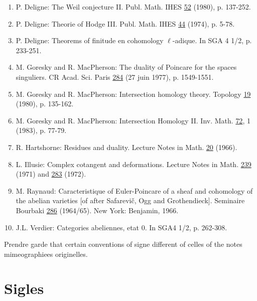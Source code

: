 \documentclass[12pt,a4paper]{article}
\theoremstyle{plain}
\theoremstyle{definition}
\theoremstyle{remark}
\begin{document}
\begin{enumerate}
\item[{[1]}] P. Deligne: The Weil conjecture II. Publ. Math. IHES \underline{52} (1980), p. 137-252.

\item[{[2]}] P. Deligne: Theorie of Hodge III. Publ. Math. IHES \underline{44} (1974), p. 5-78.

\item[{[3]}] P. Deligne: Theorems of finitude en cohomology $\ell$-adique. In SGA 4 1/2, p. 233-251.

\item[{[4]}] M. Goresky and R. MacPherson: The duality of Poincare for the spaces singuliers. CR Acad. Sci. Paris \underline{284} (27 juin 1977), p. 1549-1551.

\item[{[5]}] M. Goresky and R. MacPherson: Intersection homology theory. Topology \underline{19} (1980), p. 135-162.

\item[{[6]}] M. Goresky and R. MacPherson: Intersection Homology II. Inv. Math. \underline{72}, 1 (1983), p. 77-79.

\item[{[7]}] R. Hartshorne: Residues and duality. Lecture Notes in Math. \underline{20} (1966).

\item[{[8]}] L. Illusie: Complex cotangent and deformations. Lecture Notes in Math. \underline{239} (1971) and \underline{283} (1972).

\item[{[9]}] M. Raynaud: Caracteristique of Euler-Poincare of a sheaf and cohomology of the abelian varieties [of after Safarevi\v{c}, Ogg and Grothendieck]. Seminaire Bourbaki \underline{286} (1964/65). New York: Benjamin, 1966.

\item[{[10]}] J.L. Verdier: Categories abeliennes, etat 0. In SGA4 1/2, p. 262-308.
\end{enumerate}

\medskip
Prendre garde that certain conventions of signe different of celles of the notes mimeographiees originelles.

\newpage
\section*{Sigles}
\end{document}
